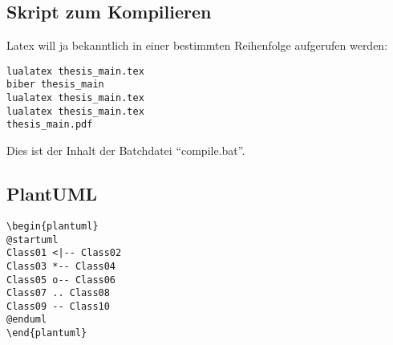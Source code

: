 \subsection{Skript zum Kompilieren}
Latex will ja bekanntlich in einer bestimmten Reihenfolge aufgerufen werden:
\begin{lstlisting}
lualatex thesis_main.tex
biber thesis_main
lualatex thesis_main.tex
lualatex thesis_main.tex
thesis_main.pdf
\end{lstlisting}

Dies ist der Inhalt der Batchdatei \enquote{compile.bat}.

\subsection{PlantUML}

\begin{lstlisting}
\begin{plantuml}
@startuml
Class01 <|-- Class02
Class03 *-- Class04
Class05 o-- Class06
Class07 .. Class08
Class09 -- Class10
@enduml
\end{plantuml}
\end{lstlisting}
